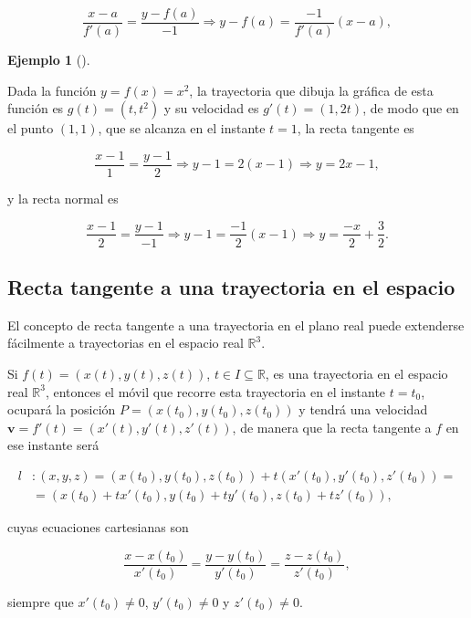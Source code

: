 \documentclass[
  a4paper,
]{scrreport}
\theoremstyle{definition}
\theoremstyle{definition}
\newtheorem{example}{Ejemplo}[chapter]
\theoremstyle{definition}
\theoremstyle{plain}
\theoremstyle{plain}
\theoremstyle{plain}
\theoremstyle{remark}
\begin{document}
\[
\frac{x-a}{f'(a)} = \frac{y-f(a)}{-1} \Rightarrow y-f(a) = \frac{-1}{f'(a)}(x-a),
\]

\begin{example}[]\protect\hypertarget{exm-tangente-normal-funcion-2}{}\label{exm-tangente-normal-funcion-2}

Dada la función \(y=f(x)=x^2\), la trayectoria que dibuja la gráfica de
esta función es \(g(t)=(t,t^2)\) y su velocidad es \(g'(t)=(1,2t)\), de
modo que en el punto \((1,1)\), que se alcanza en el instante \(t=1\),
la recta tangente es

\[
\frac{x-1}{1} = \frac{y-1}{2} \Rightarrow y-1 = 2(x-1) \Rightarrow y = 2x-1,
\]

y la recta normal es

\[
\frac{x-1}{2} = \frac{y-1}{-1} \Rightarrow y-1 = \frac{-1}{2}(x-1) \Rightarrow y = \frac{-x}{2}+\frac{3}{2}.
\]

\end{example}

\subsection{Recta tangente a una trayectoria en el
espacio}\label{recta-tangente-a-una-trayectoria-en-el-espacio}

El concepto de recta tangente a una trayectoria en el plano real puede
extenderse fácilmente a trayectorias en el espacio real
\(\mathbb{R}^3\).

Si \(f(t)=(x(t),y(t),z(t))\), \(t\in I\subseteq \mathbb{R}\), es una
trayectoria en el espacio real \(\mathbb{R}^3\), entonces el móvil que
recorre esta trayectoria en el instante \(t=t_0\), ocupará la posición
\(P=(x(t_0),y(t_0),z(t_0))\) y tendrá una velocidad
\(\mathbf{v}=f'(t)=(x'(t),y'(t),z'(t))\), de manera que la recta
tangente a \(f\) en ese instante será

\begin{align*}
l&: (x,y,z)=(x(t_0),y(t_0),z(t_0))+t(x'(t_0),y'(t_0),z'(t_0)) =\\
&= (x(t_0)+tx'(t_0),y(t_0)+ty'(t_0),z(t_0)+tz'(t_0)),
\end{align*}

cuyas ecuaciones cartesianas son

\[
\frac{x-x(t_0)}{x'(t_0)}=\frac{y-y(t_0)}{y'(t_0)}=\frac{z-z(t_0)}{z'(t_0)},
\]

siempre que \(x'(t_0)\neq 0\), \(y'(t_0)\neq 0\) y \(z'(t_0)\neq 0\).
\end{document}
